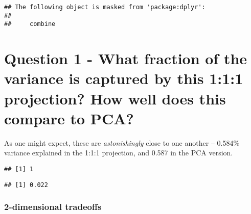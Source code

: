 \documentclass[]{article}
\begin{document}
\begin{verbatim}
## The following object is masked from 'package:dplyr':
## 
##     combine
\end{verbatim}

\hypertarget{question-1---what-fraction-of-the-variance-is-captured-by-this-111-projection-how-well-does-this-compare-to-pca}{%
\section{Question 1 - What fraction of the variance is captured by this
1:1:1 projection? How well does this compare to
PCA?}\label{question-1---what-fraction-of-the-variance-is-captured-by-this-111-projection-how-well-does-this-compare-to-pca}}

As one might expect, these are \emph{astonishingly} close to one another
-- 0.584\% variance explained in the 1:1:1 projection, and 0.587 in the
PCA version.

\begin{verbatim}
## [1] 1
\end{verbatim}

\begin{verbatim}
## [1] 0.022
\end{verbatim}

\hypertarget{dimensional-tradeoffs}{%
\subsubsection{2-dimensional tradeoffs}\label{dimensional-tradeoffs}}
\end{document}
